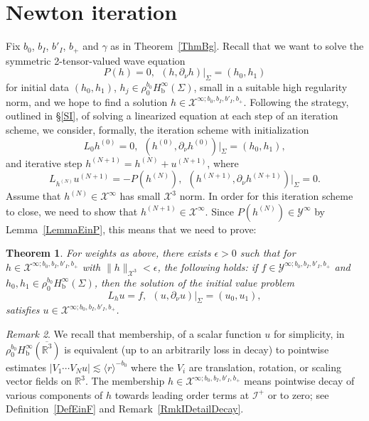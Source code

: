 \documentclass[reqno,11pt,letterpaper]{amsart}
\numberwithin{equation}{section}
\numberwithin{figure}{section}
\newtheorem{thm}{Theorem}[section]
\theoremstyle{definition}
\theoremstyle{remark}
\newtheorem{rmk}[thm]{Remark}
\newcommand{\mc}{\mathcal}
\newcommand{\cX}{\mc X}
\newcommand{\cY}{\mc Y}
\newcommand{\ms}{\mathscr}
\newcommand{\scri}{\ms I}
\newcommand{\R}{\mathbb{R}}
\newcommand{\eps}{\epsilon}
\newcommand{\la}{\langle}
\newcommand{\ol}{\overline}
\newcommand{\pa}{\partial}
\newcommand{\ra}{\rangle}
\newcommand{\bop}{{\mathrm{b}}}
\newcommand{\Hb}{H_{\bop}}
\begin{document}
\section{Newton iteration}
\label{SIt}

Fix $b_0$, $b_I$, $b'_I$, $b_+$ and $\gamma$ as in Theorem~\ref{ThmBg}. Recall that we want to solve the symmetric 2-tensor-valued wave equation
\[
  P(h)=0,\ \ 
  (h,\pa_\nu h)|_\Sigma = (h_0, h_1)
\]
for initial data $(h_0,h_1)$, $h_j\in\rho_0^{b_0}\Hb^\infty(\Sigma)$, small in a suitable high regularity norm, and we hope to find a solution $h\in\cX^{\infty;b_0,b_I,b'_I,b_+}$. Following the strategy, outlined in \S\ref{SI}, of solving a linearized equation at each step of an iteration scheme, we consider, formally, the iteration scheme with initialization
\[
  L_0 h^{(0)}=0,\ \ 
  (h^{(0)},\pa_\nu h^{(0)})|_\Sigma = (h_0, h_1),
\]
and iterative step $h^{(N+1)}=h^{(N)}+u^{(N+1)}$, where
\[
  L_{h^{(N)}}u^{(N+1)} = -P(h^{(N)}),\ \ 
  (h^{(N+1)},\pa_\nu h^{(N+1)})|_\Sigma = 0.
\]
Assume that $h^{(N)}\in\cX^\infty$ has small $\cX^3$ norm. In order for this iteration scheme to close, we need to show that $h^{(N+1)}\in\cX^\infty$. Since $P(h^{(N)})\in\cY^\infty$ by Lemma~\ref{LemmaEinP}, this means that we need to prove:

\begin{thm}
\label{ThmIt}
  For weights as above, there exists $\eps>0$ such that for $h\in\cX^{\infty;b_0,b_I,b'_I,b_+}$ with $\|h\|_{\cX^3}<\eps$, the following holds: if $f\in\cY^{\infty;b_0,b_I,b'_I,b_+}$ and $h_0,h_1\in\rho_0^{b_0}\Hb^\infty(\Sigma)$, then the solution of the initial value problem
  \[
    L_h u = f,\ \ 
    (u,\pa_\nu u)|_\Sigma = (u_0,u_1),
  \]
  satisfies $u\in\cX^{\infty;b_0,b_I,b'_I,b_+}$.
\end{thm}

\begin{rmk}
\label{RmkItDecay}
  We recall that membership, of a scalar function $u$ for simplicity, in $\rho_0^{b_0}\Hb^\infty(\ol{\R^3})$ is equivalent (up to an arbitrarily loss in decay) to pointwise estimates $|V_1\cdots V_N u|\lesssim\la r\ra^{-b_0}$ where the $V_i$ are translation, rotation, or scaling vector fields on $\R^3$. The membership $h\in\cX^{\infty;b_0,b_I,b'_I,b_+}$ means pointwise decay of various components of $h$ towards leading order terms at $\scri^+$ or to zero; see Definition~\ref{DefEinF} and Remark~\ref{RmkIDetailDecay}.
\end{rmk}
\end{document}
